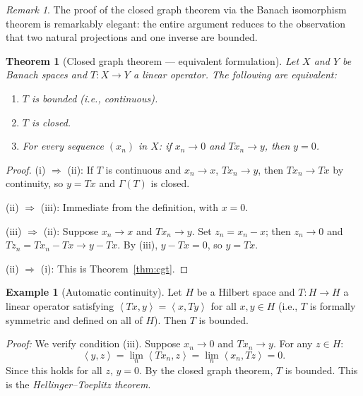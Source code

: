 \documentclass[a4paper,12pt]{book}
\newcommand{\inner}[2]{\left\langle #1, #2 \right\rangle}
\theoremstyle{definition}
\newtheorem{example}[definition]{Example}
\theoremstyle{plain}
\newtheorem{theorem}[definition]{Theorem}
\theoremstyle{remark}
\newtheorem{remark}[definition]{Remark}
\begin{document}
\begin{remark}\label{rem:cgt-elegant}
The proof of the closed graph theorem via the Banach isomorphism theorem is
remarkably elegant: the entire argument reduces to the observation that two natural
projections and one inverse are bounded.
\end{remark}

\begin{theorem}[Closed graph theorem --- equivalent formulation]\label{thm:cgt-equiv}
Let $X$ and $Y$ be Banach spaces and $T \colon X \to Y$ a linear operator. The
following are equivalent:
\begin{enumerate}[label=(\roman*)]
  \item $T$ is bounded (i.e., continuous).
  \item $T$ is closed.
  \item For every sequence $(x_n)$ in $X$: if $x_n \to 0$ and $Tx_n \to y$,
    then $y = 0$.
\end{enumerate}
\end{theorem}

\begin{proof}
(i) $\Rightarrow$ (ii): If $T$ is continuous and $x_n \to x$, $Tx_n \to y$, then
$Tx_n \to Tx$ by continuity, so $y = Tx$ and $\Gamma(T)$ is closed.

(ii) $\Rightarrow$ (iii): Immediate from the definition, with $x = 0$.

(iii) $\Rightarrow$ (ii): Suppose $x_n \to x$ and $Tx_n \to y$. Set
$z_n = x_n - x$; then $z_n \to 0$ and $Tz_n = Tx_n - Tx \to y - Tx$. By (iii),
$y - Tx = 0$, so $y = Tx$.

(ii) $\Rightarrow$ (i): This is Theorem~\ref{thm:cgt}.
\end{proof}

\begin{example}[Automatic continuity]\label{ex:automatic-continuity}
Let $H$ be a Hilbert space and $T \colon H \to H$ a linear operator satisfying
$\inner{Tx}{y} = \inner{x}{Ty}$ for all $x, y \in H$ (i.e., $T$ is formally
symmetric and defined on all of $H$). Then $T$ is bounded.

\textit{Proof:} We verify condition (iii). Suppose $x_n \to 0$ and $Tx_n \to y$.
For any $z \in H$:
\[
  \inner{y}{z} = \lim_n \inner{Tx_n}{z} = \lim_n \inner{x_n}{Tz} = 0.
\]
Since this holds for all $z$, $y = 0$. By the closed graph theorem, $T$ is bounded.
This is the \emph{Hellinger--Toeplitz theorem}.
\end{example}
\end{document}
